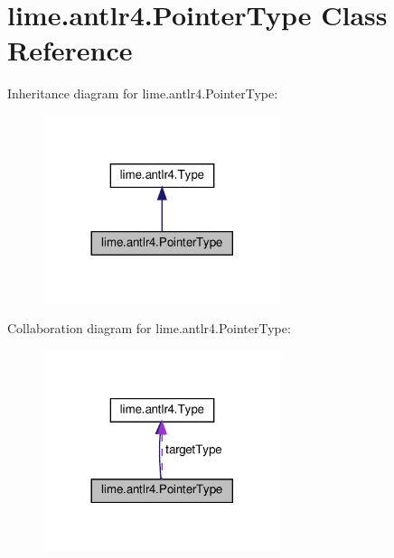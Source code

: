 \hypertarget{classlime_1_1antlr4_1_1PointerType}{}\section{lime.\+antlr4.\+Pointer\+Type Class Reference}
\label{classlime_1_1antlr4_1_1PointerType}


Inheritance diagram for lime.\+antlr4.\+Pointer\+Type\+:
\nopagebreak
\begin{figure}[H]
\begin{center}
\leavevmode
\includegraphics[width=197pt]{classlime_1_1antlr4_1_1PointerType__inherit__graph}
\end{center}
\end{figure}


Collaboration diagram for lime.\+antlr4.\+Pointer\+Type\+:
\nopagebreak
\begin{figure}[H]
\begin{center}
\leavevmode
\includegraphics[width=197pt]{classlime_1_1antlr4_1_1PointerType__coll__graph}
\end{center}
\end{figure}
